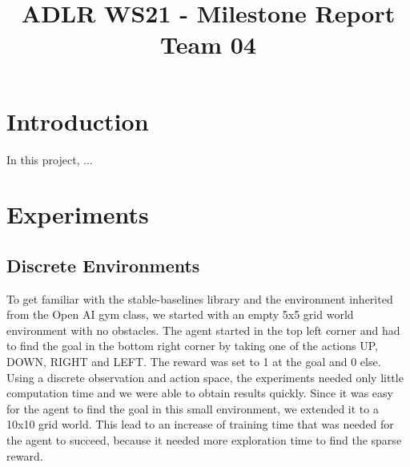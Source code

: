 \documentclass[conference]{IEEEtran}
\begin{document}
\title{ADLR WS21 - Milestone Report Team 04\\
}

\author{
\and
{}
}

\maketitle

\section{Introduction}
In this project, ...

\section{Experiments}

\subsection{Discrete Environments}

To get familiar with the stable-baselines library and the environment inherited from the Open AI gym class, we started with an empty 5x5 grid world environment with no obstacles. The agent started in the top left corner and had to find the goal in the bottom right corner by taking one of the actions UP, DOWN, RIGHT and LEFT. The reward was set to 1 at the goal and 0 else. Using a discrete observation and action space, the experiments needed only little computation time and we were able to obtain results quickly. Since it was easy for the agent to find the goal in this small environment, we extended it to a 10x10 grid world. This lead to an increase of training time that was needed for the agent to succeed, because it needed more exploration time to find the sparse reward. 
\end{document}

